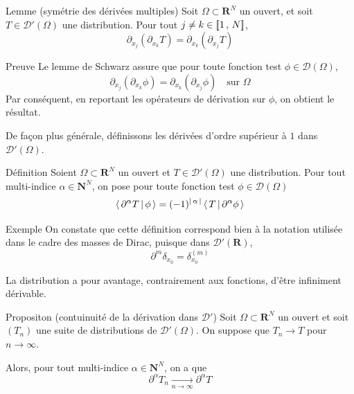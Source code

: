         \begin{omed}{Lemme (symétrie des dérivées multiples)}
            Soit $\Omega \subset\mathbf{R}^N$ un ouvert, et soit $T \in \mathcal{D}'(\Omega)$ une distribution. Pour tout $j \neq k \in \left[\!\left[ 1 \, , \, N \right]\!\right]$, 
            \[ \partial_{x_j} \left(\partial_{x_k} T\right) = \partial_{x_k} \left(\partial_{x_j} T\right) \]   
        \end{omed}
        
        \begin{demo}{Preuve}
            Le lemme de Schwarz assure que pour toute fonction test $\phi \in \mathcal{D}(\Omega)$, 
            \[ \partial_{x_j} \left(\partial_{x_k} \phi\right) = \partial_{x_k} \left(\partial_{x_j}\phi\right) \quad \text{sur } \Omega \]
            Par conséquent, en reportant les opérateurs de dérivation sur $\phi$, on obtient le résultat.
        \end{demo}

        De façon plus générale, définissons les dérivées d’ordre supérieur à $1$ dans $\mathcal{D}'(\Omega)$. 

        \begin{omed}{Définition}
            Soient $\Omega \subset \mathbf{R}^N$ un ouvert et $T \in \mathcal{D}'(\Omega)$ une distribution. Pour tout multi-indice $\alpha \in \mathbf{N}^N$, on pose pour toute fonction test $\phi \in \mathcal{D}(\Omega)$
            \[ \left< \, \partial^{\alpha} T \, \middle| \, \phi \, \right> = (-1)^{\left\lvert \, \alpha \, \right\rvert} \left< \, T \, \middle| \, \partial^{\alpha}\phi \, \right> \] 
        \end{omed}

        \begin{demo}{Exemple}
            On constate que cette définition correspond bien à la notation utilisée dans le cadre des masses de Dirac, puisque dans $\mathcal{D}'(\mathbf{R})$, 
            \[ \partial^m \delta_{x_0} = \delta^{(m)}_{x_0} \]   
        \end{demo}

        La distribution a pour avantage, contrairement aux fonctions, d’être infiniment dérivable. 

        \begin{omed}{Propositon (contuinuité de la dérivation dans $\mathcal{D}'$)}
            Soit $\Omega \subset \mathbf{R}^N$ un ouvert et soit $(T_n)$ une suite de distributions de $\mathcal{D}'(\Omega)$. On suppose que $T_n \to T$ pour $n \to \infty$.

            Alors, pour tout multi-indice $\alpha \in \mathbf{N}^N$, on a que 
            \[ \partial^{\alpha} T_n \underset{n \to \infty}{\longrightarrow} \partial^{\alpha} T \]
        \end{omed}

